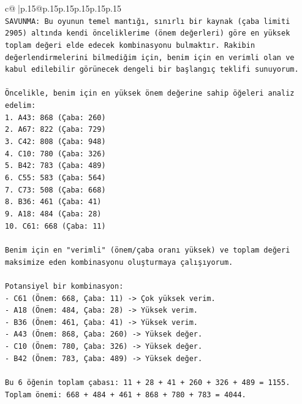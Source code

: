 \documentclass{article}
\begin{document}
{\begin{supertabular}{c@{$\;$}|p{.15\linewidth}@{}p{.15\linewidth}p{.15\linewidth}p{.15\linewidth}p{.15\linewidth}p{.15\linewidth}}
{{{\\ 
\texttt{SAVUNMA: Bu oyunun temel mantığı, sınırlı bir kaynak (çaba limiti 2905) altında kendi önceliklerime (önem değerleri) göre en yüksek toplam değeri elde edecek kombinasyonu bulmaktır. Rakibin değerlendirmelerini bilmediğim için, benim için en verimli olan ve kabul edilebilir görünecek dengeli bir başlangıç teklifi sunuyorum.} \\
\\ 
\texttt{Öncelikle, benim için en yüksek önem değerine sahip öğeleri analiz edelim:} \\
\texttt{1. A43: 868 (Çaba: 260)} \\
\texttt{2. A67: 822 (Çaba: 729)} \\
\texttt{3. C42: 808 (Çaba: 948)} \\
\texttt{4. C10: 780 (Çaba: 326)} \\
\texttt{5. B42: 783 (Çaba: 489)} \\
\texttt{6. C55: 583 (Çaba: 564)} \\
\texttt{7. C73: 508 (Çaba: 668)} \\
\texttt{8. B36: 461 (Çaba: 41)} \\
\texttt{9. A18: 484 (Çaba: 28)} \\
\texttt{10. C61: 668 (Çaba: 11)} \\
\\ 
\texttt{Benim için en "verimli" (önem/çaba oranı yüksek) ve toplam değeri maksimize eden kombinasyonu oluşturmaya çalışıyorum.} \\
\\ 
\texttt{Potansiyel bir kombinasyon:} \\
\texttt{{-} C61 (Önem: 668, Çaba: 11) {-}> Çok yüksek verim.} \\
\texttt{{-} A18 (Önem: 484, Çaba: 28) {-}> Yüksek verim.} \\
\texttt{{-} B36 (Önem: 461, Çaba: 41) {-}> Yüksek verim.} \\
\texttt{{-} A43 (Önem: 868, Çaba: 260) {-}> Yüksek değer.} \\
\texttt{{-} C10 (Önem: 780, Çaba: 326) {-}> Yüksek değer.} \\
\texttt{{-} B42 (Önem: 783, Çaba: 489) {-}> Yüksek değer.} \\
\\ 
\texttt{Bu 6 öğenin toplam çabası: 11 + 28 + 41 + 260 + 326 + 489 = 1155.} \\
\texttt{Toplam önemi: 668 + 484 + 461 + 868 + 780 + 783 = 4044.} \\
\\ 
}}}
\end{supertabular}}
\end{document}
